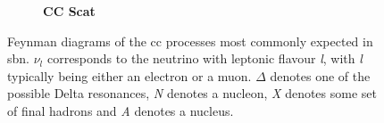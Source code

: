 \begin{figure}[h!]
\begin{subfigure}{0.3\linewidth}
{}
\end{subfigure}
\begin{subfigure}{0.3\linewidth}
\vspace{0.3cm}
\centering \textbf{CC \electron Scat} \\ \vspace{0.3cm}
\end{subfigure}
\caption[Feynman diagrams of the \gls{cc} processes most commonly expected in \gls{sbn}.]{Feynman diagrams of the \gls{cc} processes most commonly expected in \gls{sbn}. $\nu_l$ corresponds to the neutrino with leptonic flavour \textit{l}, with \textit{l} typically being either an electron or a muon. $\Delta$ denotes one of the possible Delta resonances, \textit{N} denotes a nucleon, \textit{X} denotes some set of final hadrons and \textit{A} denotes a nucleus.}
\label{fig:CC_Feynman_diagrams}
\end{figure}


